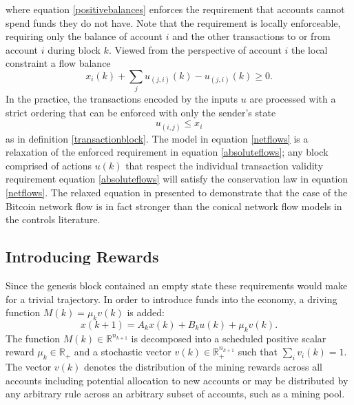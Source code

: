 \documentclass[letterpaper, 10 pt, conference]{ieeeconf}  %
\begin{document}
where equation \eqref{positivebalances} enforces the requirement that accounts cannot spend funds they do not have. Note that the requirement is locally enforceable, requiring only the balance of account $i$ and the other transactions to or from account $i$ during block $k$. Viewed from the perspective of account $i$ the local constraint a flow balance
\begin{equation}
    x_i(k) + \sum_{j} u_{(j,i)}(k)-u_{(j,i)}(k) \ge 0. \label{netflows}
\end{equation}
In the practice, the transactions encoded by the inputs $u$ are processed with a strict ordering that can be enforced with only the sender's state
\begin{equation}
    u_{(i,j)} \le x_i \label{absoluteflows}
\end{equation}
as in definition \ref{transactionblock}. The model in equation \eqref{netflows} is a relaxation of the enforced requirement in equation \eqref{absoluteflows}; any block comprised of actions $u(k)$ that respect the individual transaction validity requirement equation \eqref{absoluteflows} will satisfy the conservation law in equation \eqref{netflows}. The relaxed equation in presented to demonstrate that the case of the Bitcoin network flow is in fact stronger than the conical network flow models in the controls literature. 

\subsection{Introducing Rewards}

Since the genesis block contained an empty state these requirements would make for a trivial trajectory. In order to introduce funds into the economy, a driving function $M(k)=\mu_k v(k)$ is added:
\begin{equation}
x(k+1) = A_k x(k) + B_k u(k) + \mu_k v(k).
\end{equation}
The function $M(k)\in\mathbb{R}^{n_{k+1}} $ is decomposed into a scheduled positive scalar reward $\mu_k \in \mathbb{R}_+$ and a stochastic vector $v(k)\in \mathbb{R}^{n_{k+1}}_+$ such that $\sum_i v_i(k)=1$. The vector $v(k)$ denotes the distribution of the mining rewards across all accounts including potential allocation to new accounts or may be distributed by any arbitrary rule across an arbitrary subset of accounts, such as a mining pool.
\end{document}
